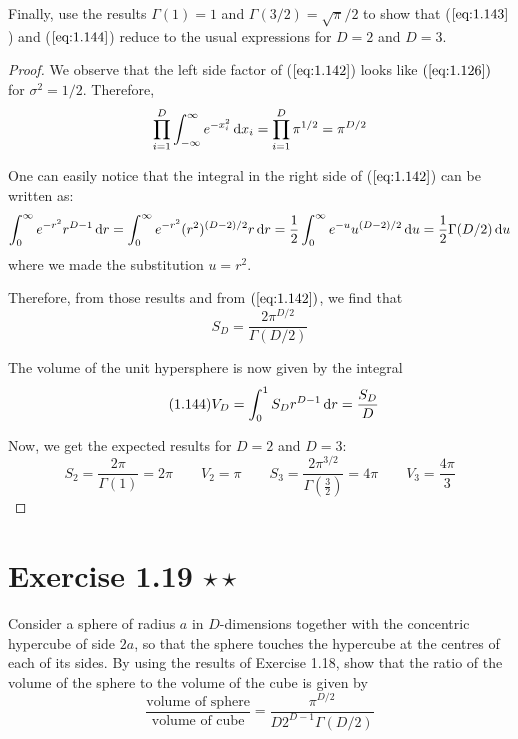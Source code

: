 Finally, use the results $\Gamma(1) = 1$ and $\Gamma(3/2) = \sqrt{\pi}/2$ to show
that ($\ref{eq:1.143}$) and ($\ref{eq:1.144}$) reduce to the usual
expressions for $D = 2$ and $D = 3$.

\vspace{1em}

\begin{proof}
    We observe that the left side factor of ($\ref{eq:1.142}$) looks like 
    $(\ref{eq:1.126})$ for $\sigma^2 = 1/2$. Therefore,
    \[
        \prod_{i = 1}^D \int_{-\infty}^{\infty} e^{-x_i^2} \mathop{}\!\mathrm{d} x_i
        = \prod_{i = 1}^D \pi^{1/2} 
        = \pi^{D/2}
    \] 

    One can easily notice that the integral in the right side of ($\ref{eq:1.142}$)
    can be written as:
     \[
         \int_{0}^{\infty} e^{-r^2}r^{D - 1} \mathop{}\!\mathrm{d} r
         = \int_{0}^{\infty} e^{-r^2} (r^2)^{(D - 2) / 2} r \mathop{}\!\mathrm{d} r
         = \frac{1}{2}\int_{0}^{\infty} e^{-u} u^{(D - 2)/2} \mathop{}\!\mathrm{d} u
         = \frac{1}{2} \Gamma(D/2) \mathop{}\!\mathrm{d} u
    \] 
    where we made the substitution $u = r^2$.

    Therefore, from those results and from $(\ref{eq:1.142})$, we find that
    \begin{equation}\tag{1.143}
        S_D =\frac{2\pi^{D/2}}{\Gamma(D/2)}
    \end{equation}

    The volume of the unit hypersphere is now given by the integral
    \begin{equation}\tag{1.144}
        V_D = \int_{0}^{1} S_D r^{D - 1} \mathop{}\!\mathrm{d} r = \frac{S_D}{D}
    \end{equation}

    Now, we get the expected results for $D = 2$ and $D = 3$:
    \[
        S_2 = \frac{2\pi}{\Gamma(1)} = 2\pi 
        \hspace{2em}
        V_2 = \pi
        \hspace{2em}
        S_3 = \frac{2\pi^{3/2}}{\Gamma(\frac{3}{2})} = 4\pi
        \hspace{2em}
        V_3 = \frac{4\pi}{3}
    \] 
\end{proof}

\section*{Exercise 1.19 $\star \star$}
Consider a sphere of radius $a$ in $D$-dimensions together with
the concentric hypercube of side $2a$, so that the sphere touches
the hypercube at the centres of each of its sides. By using the results
of Exercise 1.18, show that the ratio of the volume of the sphere
to the volume of the cube is given by
\begin{equation}\label{eq:1.145}\tag{1.145}
    \frac{\text{volume of sphere}}{\text{volume of cube}} 
    = \frac{\pi^{D/2}}{D2^{D - 1}\Gamma(D/2)}
\end{equation}

